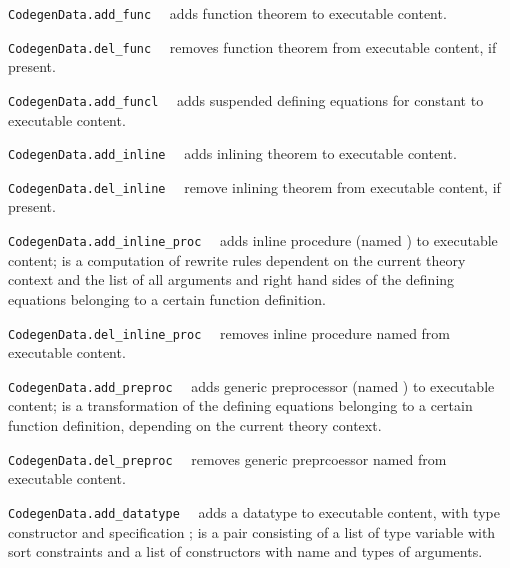 \begin{isabellebody}
\begin{isamarkuptext}
\begin{description}
  \item \verb|CodegenData.add_func|~~ adds function
     theorem  to executable content.

  \item \verb|CodegenData.del_func|~~ removes function
     theorem  from executable content, if present.

  \item \verb|CodegenData.add_funcl|~~ adds
     suspended defining equations  for constant
      to executable content.

  \item \verb|CodegenData.add_inline|~~ adds
     inlining theorem  to executable content.

  \item \verb|CodegenData.del_inline|~~ remove
     inlining theorem  from executable content, if present.

  \item \verb|CodegenData.add_inline_proc|~~ adds
     inline procedure  (named ) to executable content;
      is a computation of rewrite rules dependent on
     the current theory context and the list of all arguments
     and right hand sides of the defining equations belonging
     to a certain function definition.

  \item \verb|CodegenData.del_inline_proc|~~ removes
     inline procedure named  from executable content.

  \item \verb|CodegenData.add_preproc|~~ adds
     generic preprocessor  (named ) to executable content;
      is a transformation of the defining equations belonging
     to a certain function definition, depending on the
     current theory context.

  \item \verb|CodegenData.del_preproc|~~ removes
     generic preprcoessor named  from executable content.

  \item \verb|CodegenData.add_datatype|~~ adds
     a datatype to executable content, with type constructor
      and specification ;  is
     a pair consisting of a list of type variable with sort
     constraints and a list of constructors with name
     and types of arguments.


\end{description}
\end{isamarkuptext}
\end{isabellebody}
